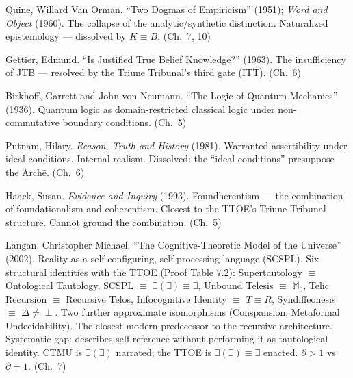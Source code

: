 \documentclass[10pt, openany, oneside]{book}
\begin{document}
{\vspace{0.3em}

\noindent Quine, Willard Van Orman. ``Two Dogmas of Empiricism'' (1951); \textit{Word and Object} (1960). The collapse of the analytic/synthetic distinction. Naturalized epistemology --- dissolved by $K \equiv B$. (Ch.\ 7, 10)

\vspace{0.3em}

\noindent Gettier, Edmund. ``Is Justified True Belief Knowledge?'' (1963). The insufficiency of JTB --- resolved by the Triune Tribunal's third gate (ITT). (Ch.\ 6)

\vspace{0.3em}

\noindent Birkhoff, Garrett and John von Neumann. ``The Logic of Quantum Mechanics'' (1936). Quantum logic as domain-restricted classical logic under non-commutative boundary conditions. (Ch.\ 5)

\vspace{0.3em}

\noindent Putnam, Hilary. \textit{Reason, Truth and History} (1981). Warranted assertibility under ideal conditions. Internal realism. Dissolved: the ``ideal conditions'' presuppose the Arch\={e}. (Ch.\ 6)

\vspace{0.3em}

\noindent Haack, Susan. \textit{Evidence and Inquiry} (1993). Foundherentism --- the combination of foundationalism and coherentism. Closest to the TTOE's Triune Tribunal structure. Cannot ground the combination. (Ch.\ 5)

\vspace{0.3em}

\noindent Langan, Christopher Michael. ``The Cognitive-Theoretic Model of the Universe'' (2002). Reality as a self-configuring, self-processing language (SCSPL). Six structural identities with the TTOE (Proof Table 7.2): Supertautology $\equiv$ Ontological Tautology, SCSPL $\equiv$ $\exists(\exists) \equiv \exists$, Unbound Telesis $\equiv$ $\mathbb{M}_0$, Telic Recursion $\equiv$ Recursive Telos, Infocognitive Identity $\equiv$ $T \equiv R$, Syndiffeonesis $\equiv$ $\Delta \neq \perp$. Two further approximate isomorphisms (Conspansion, Metaformal Undecidability). The closest modern predecessor to the recursive architecture. Systematic gap: describes self-reference without performing it as tautological identity. CTMU is $\exists(\exists)$ narrated; the TTOE is $\exists(\exists) \equiv \exists$ enacted. $\partial > 1$ vs $\partial = 1$. (Ch.\ 7)

}
\end{document}

